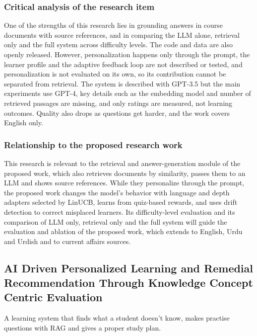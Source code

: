 \documentclass{FastFyp}
\begin{document}
\subsubsection{Critical analysis of the research item}
One of the strengths of this research lies in grounding answers in course documents with source references, and in comparing the LLM alone, retrieval only and the full system across difficulty levels. The code and data are also openly released. However, personalization happens only through the prompt, the learner profile and the adaptive feedback loop are not described or tested, and personalization is not evaluated on its own, so its contribution cannot be separated from retrieval. The system is described with GPT-3.5 but the main experiments use GPT-4, key details such as the embedding model and number of retrieved passages are missing, and only ratings are measured, not learning outcomes. Quality also drops as questions get harder, and the work covers English only.


\subsubsection{Relationship to the proposed research work}
This research is relevant to the retrieval and answer-generation module of the proposed work, which also retrieves documents by similarity, passes them to an LLM and shows source references. While they personalize through the prompt, the proposed work changes the model's behavior with language and depth adapters selected by LinUCB, learns from quiz-based rewards, and uses drift detection to correct misplaced learners. Its difficulty-level evaluation and its comparison of LLM only, retrieval only and the full system will guide the evaluation and ablation of the proposed work, which extends to English, Urdu and Urdish and to current affairs sources.



\subsection{AI Driven Personalized Learning and Remedial Recommendation Through Knowledge Concept Centric Evaluation}
A learning system that finds what a student doesn't know, makes practise questions with RAG and gives a proper study plan.
\end{document}
